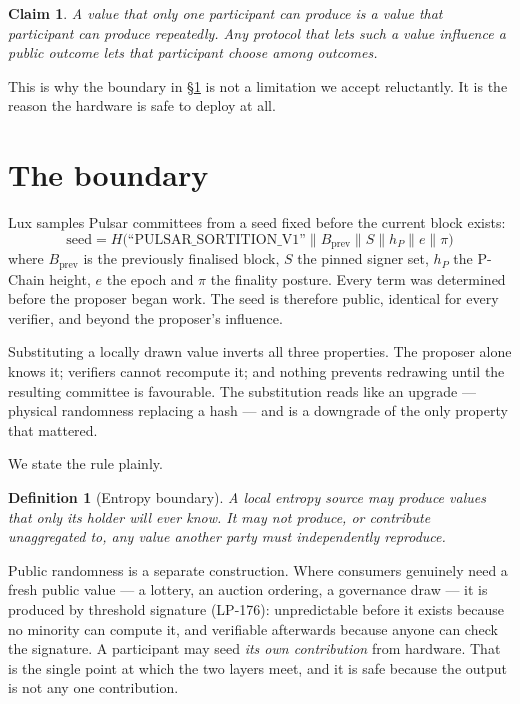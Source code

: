 \documentclass[11pt,a4paper]{article}
\newtheorem{definition}{Definition}[section]
\newtheorem{claim}{Claim}[section]
\begin{document}
\begin{claim}
A value that only one participant can produce is a value that participant can
produce repeatedly. Any protocol that lets such a value influence a public
outcome lets that participant choose among outcomes.
\end{claim}

This is why the boundary in \S\ref{sec:boundary} is not a limitation we accept
reluctantly. It is the reason the hardware is safe to deploy at all.

\section{The boundary}\label{sec:boundary}

Lux samples Pulsar committees from a seed fixed before the current block
exists:
\[
\mathrm{seed} = H\bigl(\text{``PULSAR\_SORTITION\_V1''} \parallel
B_{\mathrm{prev}} \parallel S \parallel h_P \parallel e \parallel \pi \bigr)
\]
where $B_{\mathrm{prev}}$ is the previously finalised block, $S$ the pinned
signer set, $h_P$ the P-Chain height, $e$ the epoch and $\pi$ the finality
posture. Every term was determined before the proposer began work. The seed is
therefore public, identical for every verifier, and beyond the proposer's
influence.

Substituting a locally drawn value inverts all three properties. The proposer
alone knows it; verifiers cannot recompute it; and nothing prevents redrawing
until the resulting committee is favourable. The substitution reads like an
upgrade --- physical randomness replacing a hash --- and is a downgrade of the
only property that mattered.

We state the rule plainly.

\begin{definition}[Entropy boundary]
A local entropy source may produce values that only its holder will ever know.
It may not produce, or contribute unaggregated to, any value another party must
independently reproduce.
\end{definition}

Public randomness is a separate construction. Where consumers genuinely need a
fresh public value --- a lottery, an auction ordering, a governance draw --- it
is produced by threshold signature (LP-176): unpredictable before it exists
because no minority can compute it, and verifiable afterwards because anyone
can check the signature. A participant may seed \emph{its own contribution}
from hardware. That is the single point at which the two layers meet, and it is
safe because the output is not any one contribution.
\end{document}

